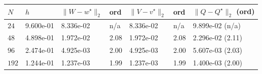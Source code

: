 \begin{tabular}{lllllll}
\toprule
$N$ & $h$ & $\|W-w^\star\|_2$ & ord & $\|V-v^\star\|_2$ & ord & $\|Q-Q^\star\|_2$ (ord) \\
\midrule
$24$ & 9.600e-01 & 8.336e-02 & n/a & 8.336e-02 & n/a & 9.899e-02 (n/a) \\
$48$ & 4.898e-01 & 1.972e-02 & 2.08 & 1.972e-02 & 2.08 & 2.296e-02 (2.11) \\
$96$ & 2.474e-01 & 4.925e-03 & 2.00 & 4.925e-03 & 2.00 & 5.607e-03 (2.03) \\
$192$ & 1.244e-01 & 1.237e-03 & 1.99 & 1.237e-03 & 1.99 & 1.400e-03 (2.00) \\
\bottomrule
\end{tabular}
